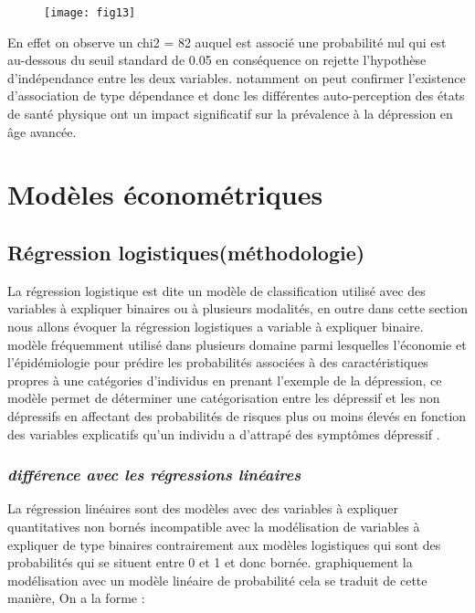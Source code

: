 \documentclass[a4paper]{article}
\begin{document}
\begin{figure}[h!]
	\centering
	\texttt{[image: fig13]}
	\caption{}
	\label{fig:fig13}
\end{figure}

En effet on observe un chi2 = 82 auquel est associé une probabilité nul qui est au-dessous du seuil standard de 0.05 en conséquence on rejette l'hypothèse d'indépendance entre les deux variables. notamment on peut confirmer l'existence d’association de type dépendance et donc les différentes auto-perception des états de santé physique ont un impact significatif sur la prévalence à la dépression en âge avancée.

\section{Modèles économétriques}

\subsection{Régression logistiques(méthodologie)} 

La régression logistique est dite un modèle de classification utilisé avec des variables à expliquer  binaires ou à plusieurs modalités, en outre dans cette section nous allons évoquer la régression logistiques a variable à expliquer binaire.\\
modèle fréquemment utilisé dans plusieurs domaine parmi lesquelles l'économie et l'épidémiologie  pour prédire les probabilités associées à des caractéristiques propres à une catégories d’individus en prenant l’exemple de la dépression, ce modèle permet de déterminer une catégorisation entre les dépressif et les non dépressifs en affectant des probabilités de risques plus ou moins élevés en fonction des variables explicatifs qu’un individu a d’attrapé des symptômes dépressif .
\subsubsection{\textit{différence avec les régressions linéaires }}
La régression linéaires sont des modèles  avec des variables à expliquer quantitatives non bornés incompatible avec la modélisation de variables à expliquer de type binaires contrairement aux modèles logistiques qui sont des probabilités qui se situent entre 0 et 1 et donc bornée.
graphiquement la modélisation avec un modèle linéaire de probabilité  cela se traduit de cette manière, On a  la forme :
\end{document}
